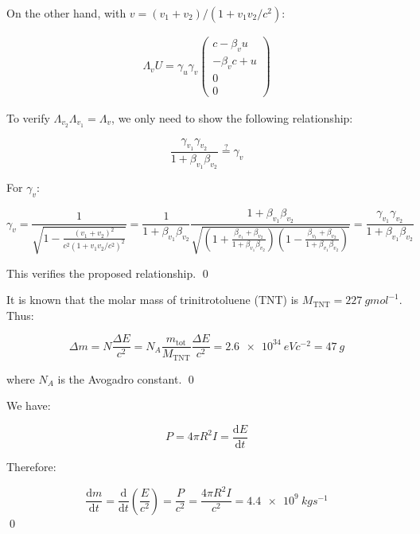 \documentclass[12pt]{article}
\begin{document}
On the other hand, with $v = (v_{1} + v_{2})/(1 + v_{1}v_{2}/c^{2})$:

\begin{equation}
    \begin{split}
        \Lambda_{v} U = \gamma_{u} \gamma_{v} \begin{pmatrix} c - \beta_{v} u \\ -\beta_{v}c + u \\ 0 \\ 0 \end{pmatrix}
    \end{split}
\end{equation}

To verify $\Lambda_{v_{2}} \Lambda_{v_{1}} = \Lambda_{v}$, we only need to show the following relationship:

\begin{equation}
    \frac{\gamma_{v_{1}} \gamma_{v_{2}}}{1 + \beta_{v_{1}} \beta_{v_{2}}} \stackrel{?}{=} \gamma_{v}
\end{equation}

For $\gamma_{v}$:

\begin{equation}
    \gamma_{v} = \frac{1}{\sqrt{1 - \frac{(v_{1} + v_{2})^{2}}{c^{2} (1 + v_{1}v_{2}/c^{2})^{2}}}} = \frac{1}{1 + \beta_{v_{1}} \beta_{v_{2}}} \frac{1 + \beta_{v_{1}} \beta_{v_{2}}}{\sqrt{\left( 1 + \frac{\beta_{v_{1}} + \beta_{v_{2}}}{1 + \beta_{v_{1}} \beta_{v_{2}}} \right) \left( 1 - \frac{\beta_{v_{1}} + \beta_{v_{2}}}{1 + \beta_{v_{1}} \beta_{v_{2}}} \right)}} = \frac{\gamma_{v_{1}} \gamma_{v_{2}}}{1 + \beta_{v_{1}} \beta_{v_{2}}}
\end{equation}

This verifies the proposed relationship.
\qed


It is known that the molar mass of trinitrotoluene (TNT) is $M_{\text{TNT}} = \qty{227}{g mol^{-1}}$. Thus:

\begin{equation}
    \Delta m = N \frac{\Delta E}{c^{2}} = N_{A} \frac{m_{\text{tot}}}{M_{\text{TNT}}} \frac{\Delta E}{c^{2}} = \qty{2.6e34}{eV c^{-2}} = \qty{47}{g}
\end{equation}

where $N_{A}$ is the Avogadro constant.
\qed


We have:

\begin{equation}
    P = 4\pi R^{2} I = \frac{\mathrm{d}E}{\mathrm{d}t}
\end{equation}

Therefore:

\begin{equation}
    \frac{\mathrm{d}m}{\mathrm{d}t} = \frac{\mathrm{d}}{\mathrm{d}t} \left( \frac{E}{c^{2}} \right) = \frac{P}{c^{2}} = \frac{4\pi R^{2} I}{c^{2}} = \qty{4.4e9}{kg s^{-1}}
\end{equation}
\qed
\end{document}

